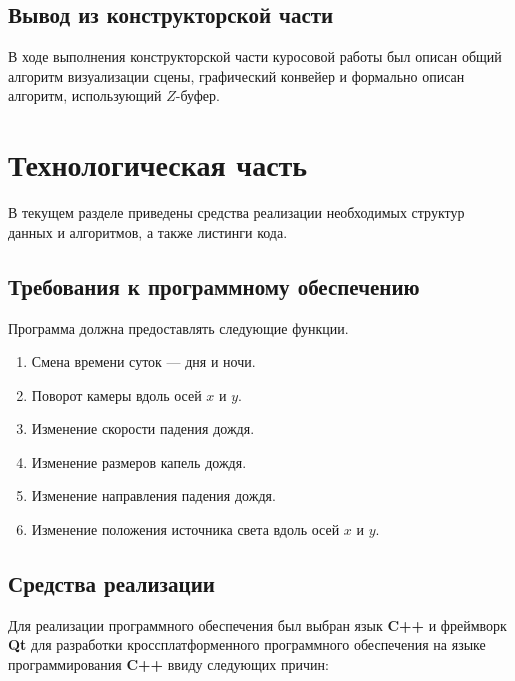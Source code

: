 \section*{Вывод из конструкторской части}

В ходе выполнения конструкторской части куросовой работы был описан общий алгоритм визуализации сцены, графический конвейер и формально описан алгоритм, использующий $Z$-буфер.

\chapter{Технологическая часть}

В текущем разделе приведены средства реализации необходимых структур данных и алгоритмов, а также листинги кода.

\section{Требования к программному обеспечению}

Программа должна предоставлять следующие функции.

\begin{enumerate}
\item
Смена времени суток --- дня и ночи.
\item
Поворот камеры вдоль осей $x$ и $y$.
\item
Изменение скорости падения дождя.
\item
Изменение размеров капель дождя.
\item
Изменение направления падения дождя.
\item
Изменение положения источника света вдоль осей $x$ и $y$.
\end{enumerate}

\section{Средства реализации}

Для реализации программного обеспечения был выбран язык \textbf{C++} и фреймворк \textbf{Qt} для разработки кроссплатформенного программного обеспечения на языке программирования \textbf{C++} ввиду следующих причин:

